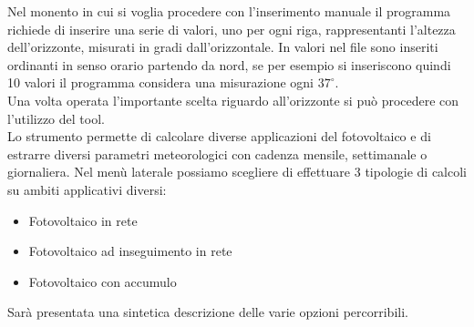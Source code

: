 Nel monento in cui si voglia procedere con l'inserimento manuale il programma richiede di inserire una serie di valori, uno per ogni riga, rappresentanti l'altezza dell'orizzonte, misurati in gradi dall'orizzontale.
In valori nel file sono inseriti ordinanti in senso orario partendo da nord, se per esempio si inseriscono quindi 10 valori il programma considera una misurazione ogni $37^\circ$.\\
Una volta operata l'importante scelta riguardo all'orizzonte si può procedere con l'utilizzo del tool.\\
Lo strumento permette di calcolare diverse applicazioni del fotovoltaico e di estrarre diversi parametri meteorologici con cadenza mensile, settimanale o giornaliera.
Nel menù laterale possiamo scegliere di effettuare 3 tipologie di calcoli su ambiti applicativi diversi:
\begin{itemize}
    \item Fotovoltaico in rete
    \item Fotovoltaico ad inseguimento in rete
    \item Fotovoltaico con accumulo
\end{itemize}
Sarà presentata una sintetica descrizione delle varie opzioni percorribili.
